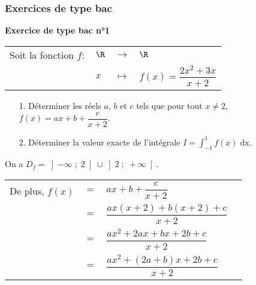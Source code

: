 \vspace*{-10cm}

\newpage

\vspace*{-2cm}

\subsubsection{Exercices de type bac}

\textbf{Exercice de type bac n°1} \\

\begin{tabular}{llll}
\hspace{-.3cm} Soit la fonction $f:$ & $\R$ & $\longrightarrow$ & $\R$ \\
& $x$ & $\longmapsto$ & $f(x) = \dfrac{2x^2 + 3x}{x+2}$ \\
\end{tabular}

\vspace*{.3cm}

\begin{itemize}
\item[1.] Déterminer les réels $a$, $b$ et $c$ tels que pour tout $x \neq 2$, $f(x) = ax + b + \dfrac{c}{x+2}$. 
\item[2.] Déterminer la valeur exacte de l'intégrale $I = \displaystyle \int_{-1}^1 f(x) \; \mathrm{dx}$. \\
\end{itemize}

On a $D_f = \left]-\infty \; ; \; 2\right[\cup \left]2 \; ; \; +\infty\right[$. \\

\begin{tabular}{llll}
\hspace{-.3cm} De plus, $f(x)$ & $=$ & $ax + b + \dfrac{c}{x+2}$ \vspace*{.3cm} \\
& $=$ & $\dfrac{ax\left(x+2\right) + b\left(x+2\right) + c}{x+2}$ \vspace*{.3cm} \\
& $=$ & $\dfrac{ax^2 + 2ax + bx + 2b + c}{x+2}$ \vspace*{.3cm} \\
& $=$ & $\dfrac{ax^2 + \left(2a + b\right)x + 2b + c}{x+2}$ \\
\end{tabular}

\vspace*{.5cm}

